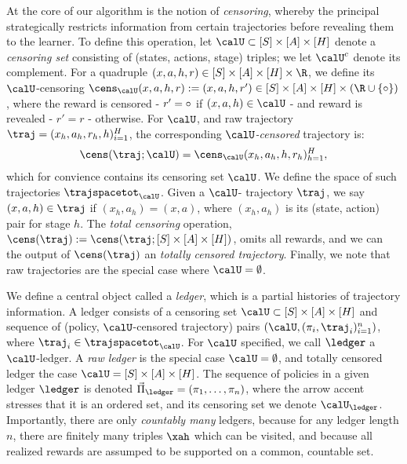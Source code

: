 At the core of our algorithm is the notion of \emph{censoring}, whereby the principal strategically restricts information from certain trajectories before revealing them to the learner. To define this operation, let $\calU \subset [S] \times [A] \times [H]$ denote a \emph{censoring set} consisting of  (states, actions, stage) triples; we let $\calU^c$ denote its complement. For a quadruple $(x,a,h,r) \in [S] \times [A] \times [H] \times \R$, we define its $\calU$-censoring $\cens_{\calU}(x,a,h,r) := (x,a,h,r') \in [S] \times [A] \times [H] \times (\R \cup \{\nullr\})$, where the reward is censored - $r' = \circ$ if $(x,a,h) \in \calU$ - and reward is revealed - $r' = r$ - otherwise.  For $\calU$, and raw trajectory $\traj = (x_h,a_h,r_h,h)_{i=1}^H$, the corresponding \emph{$\calU$-censored} trajectory is:
 \begin{align}
 \cens(\traj;\calU) = \cens_{\calU}(x_h,a_h,h,r_h)_{h=1}^H,
 \end{align}
 which for convience contains its censoring set $\calU$.  We define the space of such trajectories $\trajspacetot_{\calU}$.
 Given a $\calU$- trajectory $\traj$, we say $(x,a,h) \in \traj$ if $(x_h,a_h) = (x,a)$, where $(x_h,a_h)$ is its (state, action) pair for stage $h$.   The \emph{total censoring} operation,  $\cens(\traj) := \cens(\traj;[S] \times [A] \times [H])$, omits all rewards, and we can the output of $\cens(\traj)$ an \emph{totally censored trajectory}.  Finally, we note that raw trajectories are the special case where $\calU = \emptyset$.


 We define a central object called a \emph{ledger}, which is a partial histories of trajectory information. A ledger consists of a censoring set $\calU \subset [S] \times [A] \times [H]$ and sequence of (policy, $\calU$-censored trajectory) pairs $(\calU,(\pi_i,\traj_i)_{i=1}^n)$, where $\traj_i \in \trajspacetot_{\calU}$. For $\calU$ specified, we call $\ledger$ a $\calU$-ledger. A \emph{raw ledger} is the special case $\calU = \emptyset$, and totally censored ledger the case $\calU = [S] \times [A] \times [H]$. The sequence of policies in a given ledger $\ledger$ is denoted $\Piseq_{\ledger} = (\pi_1,\dots,\pi_n)$, where the arrow accent stresses that it is an ordered set, and its censoring set we denote $\calU_{\ledger}$. Importantly, there are only \emph{countably many} ledgers, because for any ledger length $n$, there are finitely many triples $\xah$ which can be visited, and because all realized rewards are assumped to be supported on a common, countable set.

